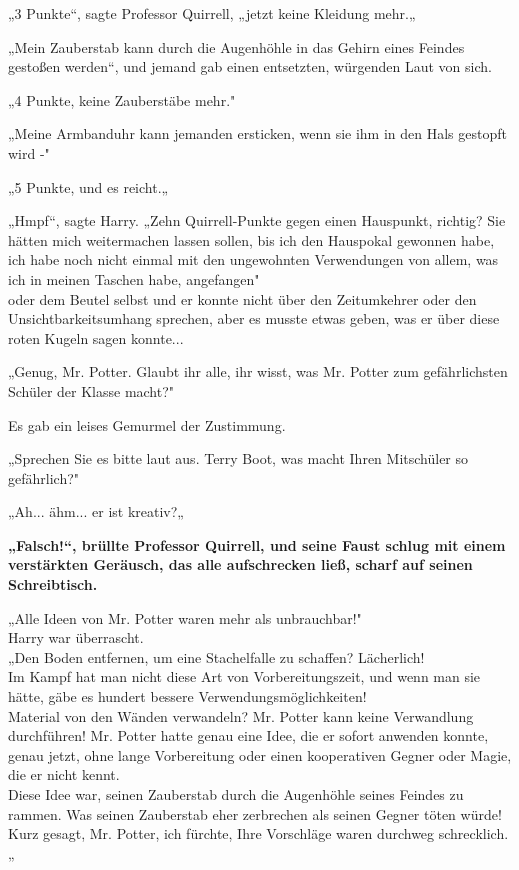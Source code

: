 {„3 Punkte“, sagte Professor Quirrell, „jetzt keine Kleidung mehr.„

„Mein Zauberstab kann durch die Augenhöhle in das Gehirn eines Feindes gestoßen werden“, und jemand gab einen entsetzten, würgenden Laut von sich.

„4 Punkte, keine Zauberstäbe mehr."

„Meine Armbanduhr kann jemanden ersticken, wenn sie ihm in den Hals gestopft wird -"

„5 Punkte, und es reicht.„

„Hmpf“, sagte Harry. „Zehn Quirrell-Punkte gegen einen Hauspunkt, richtig? Sie hätten mich weitermachen lassen sollen, bis ich den Hauspokal gewonnen habe, ich habe noch nicht einmal mit den ungewohnten Verwendungen von allem, was ich in meinen Taschen habe, angefangen"\\ oder dem Beutel selbst und er konnte nicht über den Zeitumkehrer oder den Unsichtbarkeitsumhang sprechen, aber es musste etwas geben, was er über diese roten Kugeln sagen konnte...

„Genug, Mr. Potter. Glaubt ihr alle, ihr wisst, was Mr. Potter zum gefährlichsten Schüler der Klasse macht?"

Es gab ein leises Gemurmel der Zustimmung.

„Sprechen Sie es bitte laut aus. Terry Boot, was macht Ihren Mitschüler so gefährlich?"

„Ah... ähm... er ist kreativ?„

\textbf{„Falsch!“, brüllte Professor Quirrell, und seine Faust schlug mit einem verstärkten Geräusch, das alle aufschrecken ließ, scharf auf seinen Schreibtisch.}

„Alle Ideen von Mr. Potter waren mehr als unbrauchbar!"\\ Harry war überrascht.\\ „Den Boden entfernen, um eine Stachelfalle zu schaffen? Lächerlich!\\ Im Kampf hat man nicht diese Art von Vorbereitungszeit, und wenn man sie hätte, gäbe es hundert bessere Verwendungsmöglichkeiten!\\ Material von den Wänden verwandeln? Mr. Potter kann keine Verwandlung durchführen! Mr. Potter hatte genau eine Idee, die er sofort anwenden konnte, genau jetzt, ohne lange Vorbereitung oder einen kooperativen Gegner oder Magie, die er nicht kennt.\\ Diese Idee war, seinen Zauberstab durch die Augenhöhle seines Feindes zu rammen. Was seinen Zauberstab eher zerbrechen als seinen Gegner töten würde!\\ Kurz gesagt, Mr. Potter, ich fürchte, Ihre Vorschläge waren durchweg schrecklich.„

}
